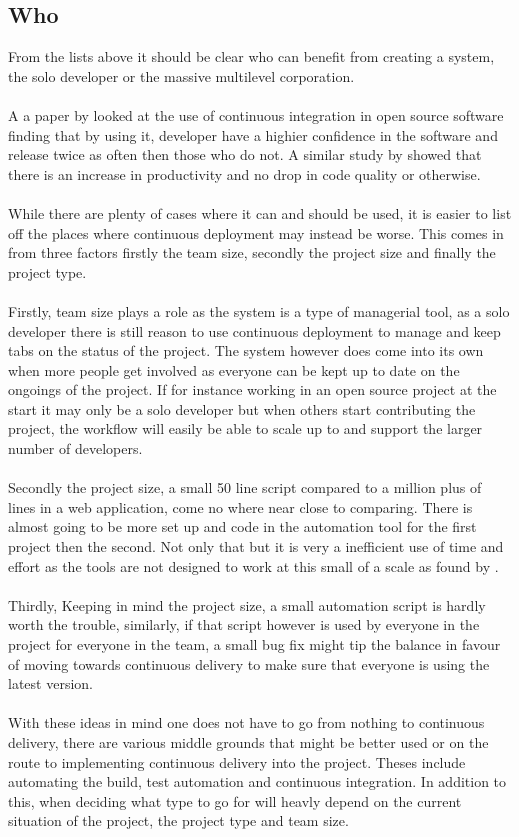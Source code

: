 \subsection{Who}

From the lists above it should be clear who can benefit from creating a system, the solo developer or the massive multilevel corporation.
\\\\
A a paper by \cite{ossuse} looked at the use of continuous integration in open source software finding that by using it, developer have a highier confidence in the software and release twice as often then those who do not. A similar study by \cite{ossprod} showed that there is an increase in productivity and no drop in code quality or otherwise.
\\\\
While there are plenty of cases where it can and should be used, it is easier to list off the places where continuous deployment may instead be worse. This comes in from three factors firstly the team size, secondly the project size and finally the project type.
\\\\
Firstly, team size plays a role as the system is a type of managerial tool, as a solo developer there is still reason to use continuous deployment to manage and keep tabs on the status of the project. The system however does come into its own when more people get involved as everyone can be kept up to date on the ongoings of the project. If for instance working in an open source project at the start it may only be a solo developer but when others start contributing the project, the workflow will easily be able to scale up to and support the larger number of developers.
\\\\
Secondly the project size, a small 50 line script compared to a million plus of lines in a web application, come no where near close to comparing. There is almost going to be more set up and code in the automation tool for the first project then the second. Not only that but it is very a inefficient use of time and effort as the tools are not designed to work at this small of a scale as found by \cite{smallci}.
\\\\
Thirdly, Keeping in mind the project size, a small automation script is hardly worth the trouble, similarly, if that script however is used by everyone in the project for everyone in the team, a small bug fix  might tip the balance in favour of moving towards continuous delivery to make sure that everyone is using the latest version. 
\\\\
With these ideas in mind one does not have to go from nothing to continuous delivery, there are various middle grounds that might be better used or on the route to implementing continuous delivery into the project. Theses include automating the build, test automation and continuous integration. In addition to this, when deciding what type to go for will heavly depend on the current situation of the project, the project type and team size.

